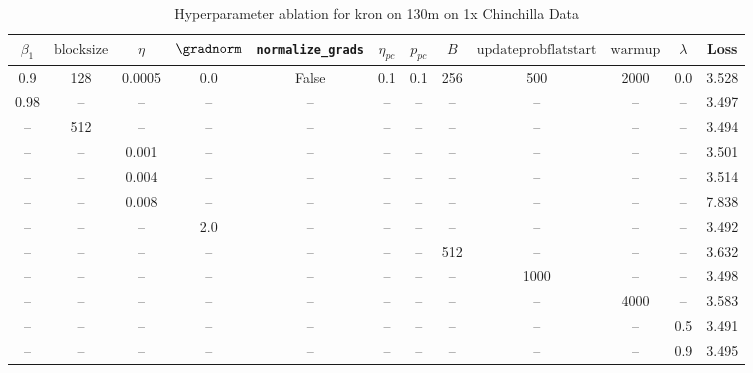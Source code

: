 \begin{table}[h!]
\centering
\caption{Hyperparameter ablation for kron on 130m on 1x Chinchilla Data}
\label{tab:ablation_kron_130m_on_1x_chinchilla_data}
\begin{tabular}{cccccccccccc}
\toprule
$\beta_1$ & $\mathrm{block size}$ & $\eta$ & $\gradnorm$ & \texttt{normalize\_grads} & $\eta_{pc}$ & $p_{pc}$ & $B$ & $\mathrm{update prob flat start}$ & $\mathrm{warmup}$ & $\lambda$ & Loss \\
\midrule
0.9 & 128 & 0.0005 & 0.0 & False & 0.1 & 0.1 & 256 & 500 & 2000 & 0.0 & 3.528 \\
\midrule
0.98 & -- & -- & -- & -- & -- & -- & -- & -- & -- & -- & 3.497 \\
-- & 512 & -- & -- & -- & -- & -- & -- & -- & -- & -- & 3.494 \\
-- & -- & 0.001 & -- & -- & -- & -- & -- & -- & -- & -- & 3.501 \\
-- & -- & 0.004 & -- & -- & -- & -- & -- & -- & -- & -- & 3.514 \\
-- & -- & 0.008 & -- & -- & -- & -- & -- & -- & -- & -- & 7.838 \\
-- & -- & -- & 2.0 & -- & -- & -- & -- & -- & -- & -- & 3.492 \\
-- & -- & -- & -- & -- & -- & -- & 512 & -- & -- & -- & 3.632 \\
-- & -- & -- & -- & -- & -- & -- & -- & 1000 & -- & -- & 3.498 \\
-- & -- & -- & -- & -- & -- & -- & -- & -- & 4000 & -- & 3.583 \\
-- & -- & -- & -- & -- & -- & -- & -- & -- & -- & 0.5 & 3.491 \\
-- & -- & -- & -- & -- & -- & -- & -- & -- & -- & 0.9 & 3.495 \\
\bottomrule
\end{tabular}
\end{table}

